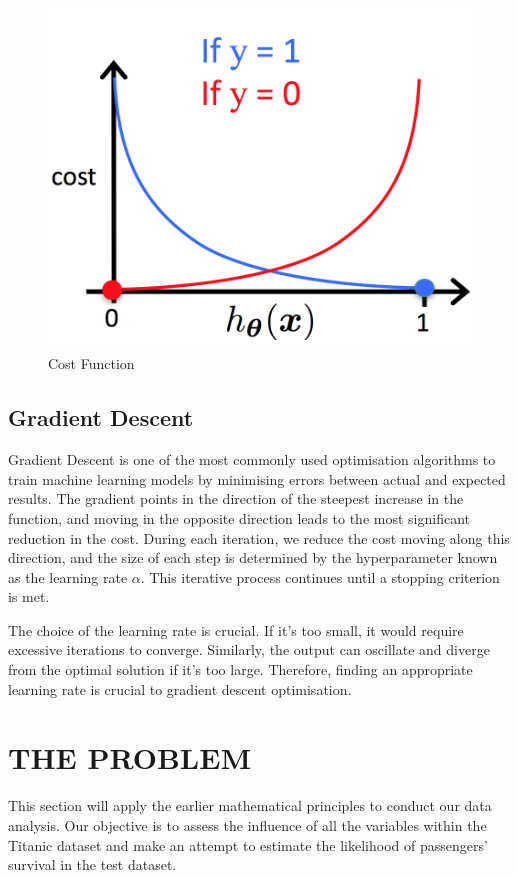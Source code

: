 \documentclass[conference]{IEEEtran}
\begin{document}
\begin{figure}[htbp]
\centerline{\includegraphics[scale = 0.5]{cost function.png}}
\caption{Cost Function}
\label{fig}
\end{figure}

\subsection{Gradient Descent}
Gradient Descent is one of the most commonly used optimisation algorithms to train machine learning models by minimising errors between actual and expected results. The gradient points in the direction of the steepest increase in the function, and moving in the opposite direction leads to the most significant reduction in the cost. During each iteration, we reduce the cost moving along this direction, and the size of each step is determined by the hyperparameter known as the learning rate \(\alpha\). This iterative process continues until a stopping criterion is met.

The choice of the learning rate is crucial. If it’s too small, it would require excessive iterations to converge. Similarly, the output can oscillate and diverge from the optimal solution if it’s too large. Therefore, finding an appropriate learning rate is crucial to gradient descent optimisation.

\vspace{2mm} %

\section{THE PROBLEM}
This section will apply the earlier mathematical principles to conduct our data analysis. Our objective is to assess the influence of all the variables within the Titanic dataset and make an attempt to estimate the likelihood of passengers’ survival in the test dataset.
\end{document}
